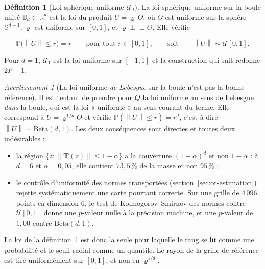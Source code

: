 \documentclass[11pt,a4paper]{article}
\theoremstyle{definition}
\newtheorem{definition}{Définition}[section]
\theoremstyle{remark}
\newtheorem{avertissement}{Avertissement}[section]
\newcommand{\R}{\mathbb{R}}
\newcommand{\PP}{\mathbb{P}}
\newcommand{\Unif}{\mathcal{U}}
\newcommand{\Bball}{\mathbb{B}}
\newcommand{\Sphere}{\mathbb{S}}
\newcommand{\norm}[1]{\left\lVert #1 \right\rVert}
\newcommand{\Tmap}{\mathbf{T}}
\begin{document}
\medskip

\begin{definition}[Loi sphérique uniforme $\Unif_d$]
  \label{def:spherique-uniforme}
  La loi sphérique uniforme sur la boule unité $\Bball_d \subset \R^d$ est la loi du produit
  $U = \varrho\,\Theta$, où $\Theta$ est uniforme sur la sphère $\Sphere^{d-1}$, $\varrho$
  est uniforme sur $[0,1]$, et $\varrho \perp\!\!\!\perp \Theta$. Elle vérifie

  \medskip

  \[
    \PP\big(\norm{U} \le r\big) = r
    \qquad \text{pour tout } r \in [0,1],
    \qquad\text{soit}\qquad
    \norm{U} \sim \Unif[0,1].
  \]

  \bigskip

  Pour $d = 1$, $\Unif_1$ est la loi uniforme sur $[-1,1]$ et la construction qui suit
  redonne $2F - 1$.
\end{definition}

\bigskip

\begin{avertissement}[La loi uniforme \emph{de Lebesgue} sur la boule n'est pas la bonne
référence]
  \label{av:lebesgue}
  Il est tentant de prendre pour $Q$ la loi uniforme au sens de Lebesgue \emph{dans} la
  boule, qui est la loi « uniforme » au sens courant du terme. Elle correspond à
  $U = \varrho^{1/d}\Theta$ et vérifie $\PP(\norm{U} \le r) = r^d$, c'est-à-dire
  $\norm{U} \sim \mathrm{Beta}(d,1)$. Les deux conséquences sont directes et toutes deux
  indésirables :

  \medskip

  \begin{itemize}[nosep,leftmargin=1.4em]
    \item la région $\{z : \norm{\Tmap(z)} \le 1-\alpha\}$ a la couverture
    $(1-\alpha)^d$ et non $1-\alpha$ : à $d = 6$ et $\alpha = 0{,}05$, elle contient
    $73{,}5\,\%$ de la masse et non $95\,\%$ ;
    \item le contrôle d'uniformité des normes transportées
    (section~\ref{sec:ot-estimation}) rejette systématiquement une carte pourtant correcte.
    Sur une grille de $4\,096$ points en dimension $6$, le test de Kolmogorov--Smirnov des
    normes contre $\Unif[0,1]$ donne une $p$-valeur nulle à la précision machine, et une
    $p$-valeur de $1{,}00$ contre $\mathrm{Beta}(d,1)$.
  \end{itemize}

  \medskip

  La loi de la définition~\ref{def:spherique-uniforme} est donc la seule pour laquelle le
  rang se lit comme une probabilité et le seuil radial comme un quantile. Le rayon de la
  grille de référence est tiré uniformément sur $[0,1]$, et non en $\varrho^{1/d}$.
\end{avertissement}
\end{document}
